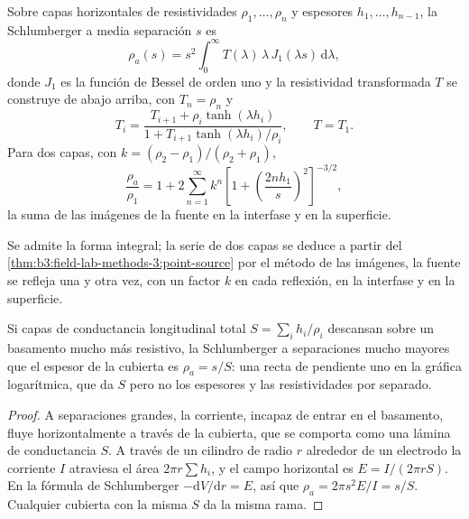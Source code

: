 \begin{proposition}\label{prop:b3:field-lab-methods-3:layers}
Sobre capas horizontales de resistividades $\rho_1, \dots, \rho_n$ y
espesores $h_1, \dots, h_{n-1}$, la  Schlumberger
a media separación $s$ es
\[
\rho_a(s) = s^2\int_0^\infty T(\lambda)\,\lambda\,J_1(\lambda s)\,\mathrm{d}\lambda ,
\]
donde $J_1$ es la función de Bessel de orden uno y la resistividad
transformada $T$ se construye de abajo arriba, con $T_n = \rho_n$ y
\[
T_i = \frac{T_{i+1} + \rho_i\tanh(\lambda h_i)}{1 + T_{i+1}\tanh(\lambda h_i)/\rho_i} ,
\qquad T = T_1 .
\]
Para dos capas, con $k = (\rho_2 - \rho_1)/(\rho_2 + \rho_1)$,
\[
\frac{\rho_a}{\rho_1} = 1 + 2\sum_{n=1}^{\infty} k^n
  \left[1 + \left(\frac{2nh_1}{s}\right)^2\right]^{-3/2} ,
\]
la suma de las imágenes de la fuente en la interfase y en la superficie.
\end{proposition}
Se admite la forma integral; la serie de dos capas se deduce a partir
del \cref{thm:b3:field-lab-methods-3:point-source} por el método de las imágenes,
la fuente se refleja una y otra vez, con un factor $k$ en cada
reflexión, en la interfase y en la superficie.

\begin{proposition}\label{prop:b3:field-lab-methods-3:conductance}
Si capas de conductancia longitudinal total $S = \sum_i h_i/\rho_i$ descansan
sobre un basamento mucho más resistivo, la  Schlumberger a
separaciones mucho mayores que el espesor de la cubierta es $\rho_a = s/S$: una recta
de pendiente uno en la gráfica logarítmica, que da $S$ pero no los
espesores y las resistividades por separado.
\end{proposition}

\begin{proof}
A separaciones grandes, la corriente, incapaz de entrar en el basamento, fluye
horizontalmente a través de la cubierta, que se comporta como una lámina de
conductancia $S$. A través de un cilindro de radio $r$ alrededor de un electrodo
la corriente $I$ atraviesa el área $2\pi r\sum h_i$, y el campo horizontal
es $E = I/(2\pi rS)$. En la fórmula de Schlumberger $-\mathrm{d}V/
\mathrm{d}r = E$, así que $\rho_a = 2\pi s^2 E/I = s/S$. Cualquier cubierta con la
misma $S$ da la misma rama.
\end{proof}

